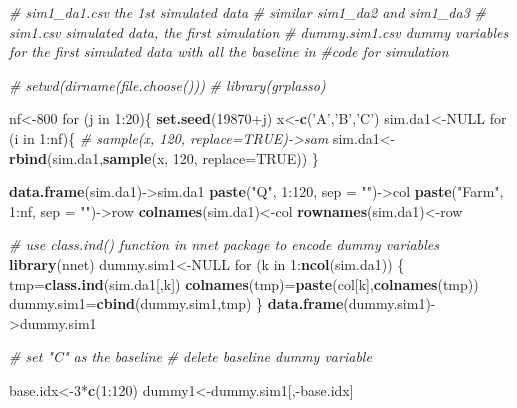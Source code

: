\documentclass[]{book}
\newenvironment{Shaded}{\begin{snugshade}}{\end{snugshade}}
\newcommand{\KeywordTok}[1]{\textcolor[rgb]{0.13,0.29,0.53}{\textbf{{#1}}}}
\newcommand{\DataTypeTok}[1]{\textcolor[rgb]{0.13,0.29,0.53}{{#1}}}
\newcommand{\DecValTok}[1]{\textcolor[rgb]{0.00,0.00,0.81}{{#1}}}
\newcommand{\StringTok}[1]{\textcolor[rgb]{0.31,0.60,0.02}{{#1}}}
\newcommand{\CommentTok}[1]{\textcolor[rgb]{0.56,0.35,0.01}{\textit{{#1}}}}
\newcommand{\OtherTok}[1]{\textcolor[rgb]{0.56,0.35,0.01}{{#1}}}
\newcommand{\NormalTok}[1]{{#1}}
\theoremstyle{definition}
\theoremstyle{definition}
\theoremstyle{remark}
\begin{document}
\begin{Shaded}
\begin{Highlighting}[]
\CommentTok{# sim1_da1.csv  the 1st simulated data}
\CommentTok{# similar sim1_da2 and sim1_da3}
\CommentTok{# sim1.csv  simulated data, the first simulation}
\CommentTok{# dummy.sim1.csv dummy variables for the first simulated data with all the baseline in}
\CommentTok{#code for simulation}

\CommentTok{# setwd(dirname(file.choose()))}
\CommentTok{# library(grplasso)}

\NormalTok{nf<-}\DecValTok{800}
\NormalTok{for (j in }\DecValTok{1}\NormalTok{:}\DecValTok{20}\NormalTok{)\{}
\KeywordTok{set.seed}\NormalTok{(}\DecValTok{19870}\NormalTok{+j)}
\NormalTok{x<-}\KeywordTok{c}\NormalTok{(}\StringTok{'A'}\NormalTok{,}\StringTok{'B'}\NormalTok{,}\StringTok{'C'}\NormalTok{)}
\NormalTok{sim.da1<-}\OtherTok{NULL}
\NormalTok{for (i in }\DecValTok{1}\NormalTok{:nf)\{}
\CommentTok{# sample(x, 120, replace=TRUE)->sam}
\NormalTok{sim.da1<-}\KeywordTok{rbind}\NormalTok{(sim.da1,}\KeywordTok{sample}\NormalTok{(x, }\DecValTok{120}\NormalTok{, }\DataTypeTok{replace=}\OtherTok{TRUE}\NormalTok{))}
\NormalTok{\}}

\KeywordTok{data.frame}\NormalTok{(sim.da1)->sim.da1}
\KeywordTok{paste}\NormalTok{(}\StringTok{"Q"}\NormalTok{, }\DecValTok{1}\NormalTok{:}\DecValTok{120}\NormalTok{, }\DataTypeTok{sep =} \StringTok{""}\NormalTok{)->col}
\KeywordTok{paste}\NormalTok{(}\StringTok{"Farm"}\NormalTok{, }\DecValTok{1}\NormalTok{:nf, }\DataTypeTok{sep =} \StringTok{""}\NormalTok{)->row}
\KeywordTok{colnames}\NormalTok{(sim.da1)<-col}
\KeywordTok{rownames}\NormalTok{(sim.da1)<-row}

\CommentTok{# use class.ind() function in nnet package to encode dummy variables}
\KeywordTok{library}\NormalTok{(nnet)}
\NormalTok{dummy.sim1<-}\OtherTok{NULL}
\NormalTok{for (k in }\DecValTok{1}\NormalTok{:}\KeywordTok{ncol}\NormalTok{(sim.da1)) \{}
\NormalTok{tmp=}\KeywordTok{class.ind}\NormalTok{(sim.da1[,k])}
\KeywordTok{colnames}\NormalTok{(tmp)=}\KeywordTok{paste}\NormalTok{(col[k],}\KeywordTok{colnames}\NormalTok{(tmp))}
\NormalTok{dummy.sim1=}\KeywordTok{cbind}\NormalTok{(dummy.sim1,tmp)}
\NormalTok{\}}
\KeywordTok{data.frame}\NormalTok{(dummy.sim1)->dummy.sim1}

\CommentTok{# set "C" as the baseline}
\CommentTok{# delete baseline dummy variable}

\NormalTok{base.idx<-}\DecValTok{3}\NormalTok{*}\KeywordTok{c}\NormalTok{(}\DecValTok{1}\NormalTok{:}\DecValTok{120}\NormalTok{)}
\NormalTok{dummy1<-dummy.sim1[,-base.idx]}


\end{Highlighting}
\end{Shaded}
\end{document}
